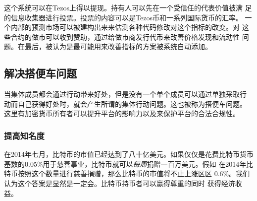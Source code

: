 \documentclass[letterpaper]{article}
\begin{document}
这个系统可以在Tezos上得以提现。持有人可以先在一个受信任的代表价值被满
足的信息收集器进行投票。投票的内容可以是Tezos币和一系列国际货币的汇率。
一个内部的预测市场可以被建构出来来估测各种代码修改对这个指标的改变。对
这些合约的做市可以收到赞助，通过给做市商发行代币来改善价格发现和流动性
问题。在最后，被认为是最可能用来改善指标的方案被系统自动添加。

\subsection{解决搭便车问题}
当集体成员都会通过行动带来好处，但是没有一个单个成员可以通过单独采取行
动而自己获得好处时，就会产生所谓的集体行动问题。这也被称为搭便车问题。
这里有加密货币所有者可以提升平台的影响力以及来保护平台的合法合规性。

\subsubsection{提高知名度}

在2014年七月，比特币的市值已经达到了八十亿美元。如果仅仅是花费比特币货币
基数的0.05\%用于慈善事业，比特币就可以\emph{每周}捐赠一百万美元。假如
在2014年比特币按照这个数量进行慈善捐赠，那么比特币的市值将不止上涨区区
0.6\%。我们认为这个答案是显然是一定会。比特币持币者可以赢得尊重的同时
获得经济收益。
\end{document}
